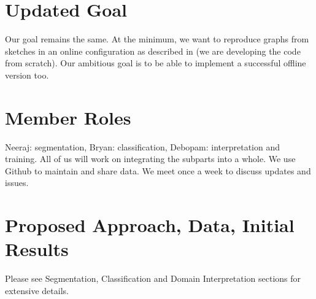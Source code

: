 \section{Updated Goal}

Our goal remains the same. At the minimum, we want to reproduce graphs from sketches in an online configuration as described in \citeauthor{daly2015hand} \cite{daly2015hand} (we are developing the code from scratch). Our ambitious goal is to be able to implement a successful offline version too.\\

\section{Member Roles}

Neeraj: segmentation, Bryan: classification, Debopam: interpretation and training. All of us will work on integrating the subparts into a whole. We use Github to maintain and share data. We meet once a week to discuss updates and issues.

\section{Proposed Approach, Data, Initial Results}

Please see Segmentation, Classification and Domain Interpretation sections for extensive details.

